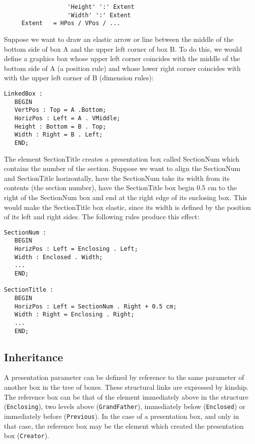 \begin{verbatim}
                  'Height' ':' Extent
                  'Width' ':' Extent
     Extent   = HPos / VPos / ...
\end{verbatim}

\begin{example}
Suppose we want to draw an elastic arrow or line between the middle of
the bottom side of box A and the upper left corner of box B.  To do
this, we would define a graphics box whose upper left corner coincides
with the middle of the bottom side of A (a position rule) and whose
lower right corner coincides with with the upper left corner of B
(dimension rules):

\begin{verbatim}
LinkedBox :
   BEGIN
   VertPos : Top = A .Bottom;
   HorizPos : Left = A . VMiddle;
   Height : Bottom = B . Top;
   Width : Right = B . Left;
   END;
\end{verbatim}
\end{example}

\begin{example}
The element SectionTitle creates a presentation box called SectionNum
which contains the number of the section.  Suppose we want to align
the SectionNum and SectionTitle horizontally, have the SectionNum take
its width from its contents (the section number), have the
SectionTitle box begin 0.5 cm to the right of the SectionNum box and
end at the right edge of its enclosing box.  This would make the
SectionTitle box elastic, since its width is defined by the position
of its left and right sides.  The following rules produce this effect:

\begin{verbatim}
SectionNum :
   BEGIN
   HorizPos : Left = Enclosing . Left;
   Width : Enclosed . Width;
   ...
   END;

SectionTitle :
   BEGIN
   HorizPos : Left = SectionNum . Right + 0.5 cm;
   Width : Right = Enclosing . Right;
   ...
   END;
\end{verbatim}
\end{example}

\subsection{Inheritance}

A presentation parameter can be defined by reference to the same
parameter of another box in the tree of boxes.  These structural links
are expressed by kinship.  The reference box can be that of the
element immediately above in the structure ({\tt Enclosing}), two
levels above ({\tt GrandFather}), immediately below ({\tt Enclosed})
or immediately before ({\tt Previous}).  In the case of a presentation
box, and only in that case, the reference box may be the element which
created the presentation box ({\tt Creator}).

